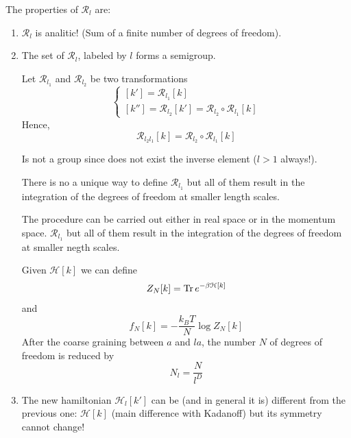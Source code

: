 \documentclass[../main/main.tex]{subfiles}
\begin{document}
The properties of \( \mathcal{R}_l \) are:
\begin{enumerate}
\item \( \mathcal{R}_l \) is analitic! (Sum of a finite number of degrees of freedom).

\item The set of \( \mathcal{R}_l \), labeled by \( l \) forms a semigroup.

Let   \( \mathcal{R}_{l_1}  \) and  \( \mathcal{R}_{l_2}  \) be two transformations
\begin{equation}
  \begin{cases}
   [k'] = \mathcal{R}_{l_1} [k] \\
  [k''] = \mathcal{R}_{l_2} [k'] = \mathcal{R}_{l_2} \circ \mathcal{R}_{l_1} [k]
  \end{cases}
\end{equation}
Hence,
\begin{equation}
  \mathcal{R}_{l_2 l_1} [k] = \mathcal{R}_{l_2} \circ \mathcal{R}_{l_1} [k]
\end{equation}
\begin{remark}
Is not a group since does not exist the inverse element (\( l>1 \) always!).
\end{remark}
\begin{remark}
There is no a unique way to define  \( \mathcal{R}_{l_1}  \) but all of them result in the integration of the degrees of freedom at smaller length scales.
\end{remark}

The procedure can be carried out either in real space or in the momentum space.
 \( \mathcal{R}_{l_1}  \) but all of them result in the integration of the degrees of freedom at smaller negth scales.

Given \( \mathcal{H} [k]\) we can define
\begin{equation}
  Z_N [k] = \Tr e^{-\beta \mathcal{H}[k]}
\end{equation}
 and
 \begin{equation}
   f_N [k] = - \frac{k_B T}{N} \log{Z_N [k]}
 \end{equation}
After the coarse graining between \( a \) and \( la \), the number \( N \) of degrees of freedom is reduced by
\begin{equation}
  N_l = \frac{N}{l^D}
\end{equation}

\item The new hamiltonian \( \mathcal{H}_l [k'] \) can be (and in general it is) different from the previous one: \( \mathcal{H} [k] \) (main difference with Kadanoff) but its symmetry cannot change!


\end{enumerate}
\end{document}
